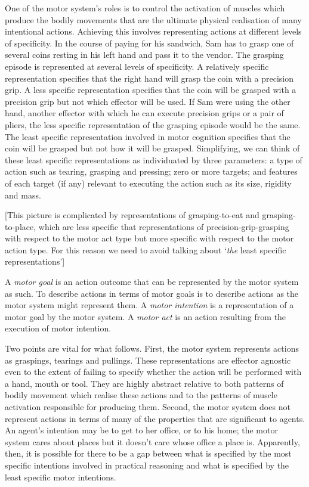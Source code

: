 \documentclass[12pt,a4paper]{extarticle}
\begin{document}
One of the motor system's roles is to control the activation of muscles which produce the bodily movements that are the ultimate physical realisation of many intentional actions.
Achieving this involves representing actions at different levels of specificity.
In the course of paying for his sandwich, Sam has to grasp one of several coins resting in his left hand and pass it to the vendor.
The grasping episode is represented at several levels of specificity.
A relatively specific representation specifies that the right hand will grasp the coin with a precision grip.
A less specific representation specifies that the coin will be grasped with a precision grip but not which effector will be used.  
If Sam were using the other hand, another effector with which he can execute precision grips or a pair of pliers, the less specific representation of the grasping episode would be the same.
The least specific representation involved in motor cognition specifies that the coin will be grasped but not how it will be grasped.
Simplifying, we can think of these least specific representations as individuated by three parameters: a type of action such as tearing, grasping and pressing; zero or more targets; and features of each target (if any) relevant to executing the action such as its size, rigidity and mass.  

[This picture is complicated by representations of grasping-to-eat and grasping-to-place, which are less specific that representations of precision-grip-grasping with respect to the motor act type but more specific with respect to the motor action type.  For this reason we need to avoid talking about `\emph{the} least specific representations']

A \emph{motor goal} is an action outcome that can be represented by the motor system as such. 
To describe actions in terms of motor goals is to describe actions as the motor system might represent them.
A \emph{motor intention} is a representation of a motor goal by the motor system.
A \emph{motor act} is an action resulting from the execution of motor intention.

Two points are vital for what follows.
First, the motor system represents actions as graspings, tearings and pullings.  These representations are effector agnostic even to the extent of failing to specify whether the action will be performed with a hand, mouth or tool.  
They are highly abstract relative to both patterns of bodily movement which realise these actions and to the patterns of muscle activation responsible for producing them.
Second, the motor system does not represent actions in terms of many of the properties that are significant to agents.  An agent's intention may be to get to her office, or to his home; the motor system cares about places but it doesn't care whose office a place is.
Apparently, then, it is possible for there to be a gap between what is specified by the most specific intentions involved in practical reasoning and what is specified by the least specific motor intentions.
\end{document}
